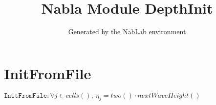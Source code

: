 \documentclass[11pt]{article}
\title{Nabla Module DepthInit}
\author{Generated by the NabLab environment}
\begin{document}
\maketitle


\section{InitFromFile}
$\texttt{InitFromFile} : \forall{j\in cells()}, \ η_{j} = two\left(\right) \cdot nextWaveHeight\left(\right)$
\end{document}
